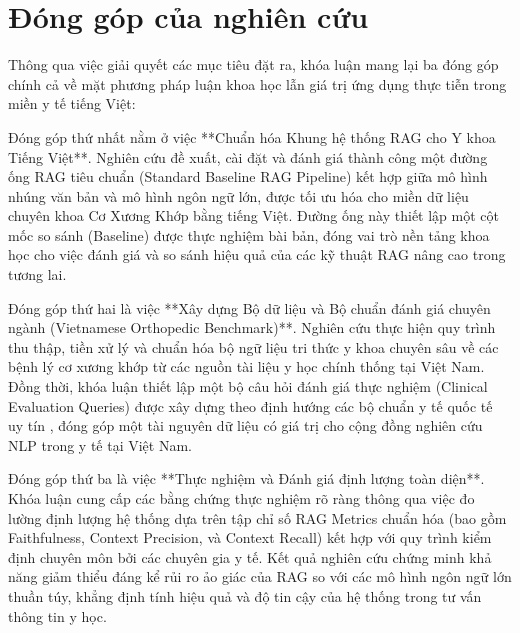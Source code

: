 \section{Đóng góp của nghiên cứu}

Thông qua việc giải quyết các mục tiêu đặt ra, khóa luận mang lại ba đóng góp chính cả về mặt phương pháp luận khoa học lẫn giá trị ứng dụng thực tiễn trong miền y tế tiếng Việt:

Đóng góp thứ nhất nằm ở việc **Chuẩn hóa Khung hệ thống RAG cho Y khoa Tiếng Việt**. Nghiên cứu đề xuất, cài đặt và đánh giá thành công một đường ống RAG tiêu chuẩn (Standard Baseline RAG Pipeline) kết hợp giữa mô hình nhúng văn bản và mô hình ngôn ngữ lớn, được tối ưu hóa cho miền dữ liệu chuyên khoa Cơ Xương Khớp bằng tiếng Việt. Đường ống này thiết lập một cột mốc so sánh (Baseline) được thực nghiệm bài bản, đóng vai trò nền tảng khoa học cho việc đánh giá và so sánh hiệu quả của các kỹ thuật RAG nâng cao trong tương lai.

Đóng góp thứ hai là việc **Xây dựng Bộ dữ liệu và Bộ chuẩn đánh giá chuyên ngành (Vietnamese Orthopedic Benchmark)**. Nghiên cứu thực hiện quy trình thu thập, tiền xử lý và chuẩn hóa bộ ngữ liệu tri thức y khoa chuyên sâu về các bệnh lý cơ xương khớp từ các nguồn tài liệu y học chính thống tại Việt Nam. Đồng thời, khóa luận thiết lập một bộ câu hỏi đánh giá thực nghiệm (Clinical Evaluation Queries) được xây dựng theo định hướng các bộ chuẩn y tế quốc tế uy tín \cite{xiong2024mirage}, đóng góp một tài nguyên dữ liệu có giá trị cho cộng đồng nghiên cứu NLP trong y tế tại Việt Nam.

Đóng góp thứ ba là việc **Thực nghiệm và Đánh giá định lượng toàn diện**. Khóa luận cung cấp các bằng chứng thực nghiệm rõ ràng thông qua việc đo lường định lượng hệ thống dựa trên tập chỉ số RAG Metrics chuẩn hóa (bao gồm Faithfulness, Context Precision, và Context Recall) kết hợp với quy trình kiểm định chuyên môn bởi các chuyên gia y tế. Kết quả nghiên cứu chứng minh khả năng giảm thiểu đáng kể rủi ro ảo giác của RAG so với các mô hình ngôn ngữ lớn thuần túy, khẳng định tính hiệu quả và độ tin cậy của hệ thống trong tư vấn thông tin y học.

